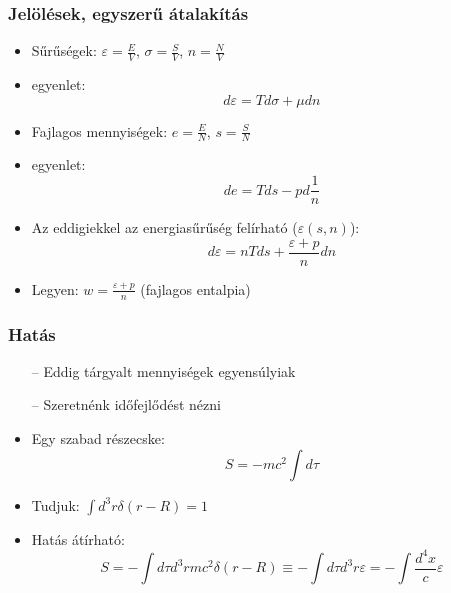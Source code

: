 \documentclass{beamer}
\begin{document}
\begin{frame}
\frametitle{Jelölések, egyszerű átalakítás}
\begin{itemize}
  \setlength{\itemsep}{16pt}
	\item Sűrűségek: $\varepsilon = \frac{E}{V}$, $\sigma = \frac{S}{V}$, $n=\frac{N}{V}$ 
	\item {} egyenlet:
		\begin{equation}
			d\varepsilon = Td\sigma+\mu dn
		\end{equation}
	\item Fajlagos mennyiségek: $e=\frac{E}{N}$, $s=\frac{S}{N}$
	\item {} egyenlet:
		\begin{equation}
			de = T ds - pd\frac{1}{n}
		\end{equation}
	\item Az eddigiekkel az energiasűrűség felírható ($\varepsilon(s,n)$):
		\begin{equation}
			d\varepsilon = nT ds + \frac{\varepsilon+p}{n}dn
		\end{equation}
	\item Legyen: $w=\frac{\varepsilon+p}{n}$ (fajlagos entalpia)
\end{itemize}
\end{frame}

\begin{frame}
\frametitle{Hatás}
\begin{itemize}
  \setlength{\itemsep}{14pt}
  \item[--] Eddig tárgyalt mennyiségek egyensúlyiak
  \item[--] Szeretnénk időfejlődést nézni
\end{itemize}

\begin{itemize}
  \setlength{\itemsep}{14pt}
  \item Egy szabad részecske:
  \begin{equation}
  	S = - mc^2\int d\tau
  \end{equation}
  \item Tudjuk: $\int d^3r \delta(r-R)=1$
  \item Hatás átírható: 
  	\begin{equation}
  		S = - \int d\tau d^3r mc^2\delta(r-R) \equiv - \int d\tau d^3r \varepsilon = -\int \frac{d^4x}{c}\varepsilon
  	\end{equation}
\end{itemize}
\end{frame}
\end{document}
